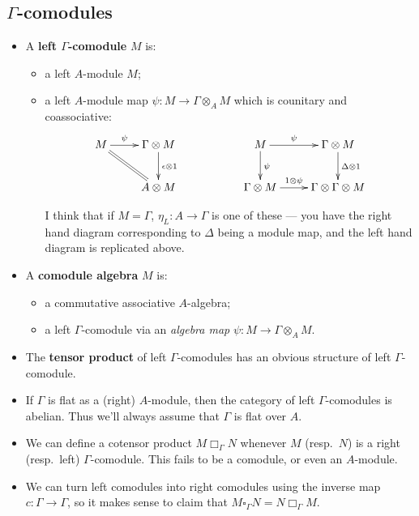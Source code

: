 \documentclass[11pt]{article}
\begin{document}
\begin{Gamma-comodules}
\subsection*{$\Gamma$-comodules}

\begin{itemize}\squishlist
\item A \textbf{left $\Gamma$-comodule} $M$ is:
\begin{itemize}\squishlist
\item a left $A$-module $M$;
\item a left $A$-module map $\psi:M\to\Gamma\otimes_A M$ which is counitary and coassociative:
\[\xymatrix{
M\ar[r]^-{\psi}&\Gamma\otimes M\ar[d]^{\epsilon\otimes1}&&
M\ar[d]^{\psi}\ar[r]^-{\psi}&\Gamma\otimes M\ar[d]^{\Delta\otimes1}\\
&A\otimes M\ar@{=}[ul]&&
\Gamma\otimes M\ar[r]^-{1\otimes\psi}& \Gamma\otimes\Gamma\otimes M
}\]
\begin{shaded}
I think that if $M=\Gamma$, $\eta_L:A\to \Gamma$ is one of these --- you have the right hand diagram corresponding to $\Delta$ being a module map, and the left hand diagram is replicated above.
\end{shaded}

\end{itemize}
\item A \textbf{comodule algebra} $M$ is:
\begin{itemize}\squishlist
\item a commutative associative $A$-algebra;
\item a left $\Gamma$-comodule via an \emph{algebra map} $\psi:M\to\Gamma\otimes_A M$.
\end{itemize}

\item The \textbf{tensor product} of left $\Gamma$-comodules has an obvious structure of left $\Gamma$-comodule.
\item If $\Gamma$ is flat as a (right) $A$-module, then the category of left $\Gamma$-comodules is abelian. Thus we'll always assume that $\Gamma$ is flat over $A$.
\item We can define a cotensor product $M\Box_\Gamma N$ whenever $M$ (resp.\ $N$) is a right (resp.\ left) $\Gamma$-comodule. This fails to be a comodule, or even an $A$-module.
\item We can turn left comodules into right comodules using the inverse map $c:\Gamma\to\Gamma$, so it makes sense to claim that $M\square_\Gamma N=N\Box_\Gamma M$.





\end{itemize}
\end{Gamma-comodules}
\end{document}
